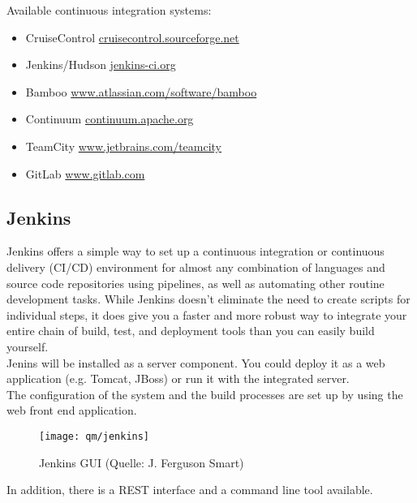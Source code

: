 Available continuous integration systems:
\begin{itemize}
\item CruiseControl \href{http://cruisecontrol.sourceforge.net}
                        {cruisecontrol.sourceforge.net}
\item Jenkins/Hudson \href{http://jenkins-ci.org}{jenkins-ci.org}
\item Bamboo  \href{http://www.atlassian.com/software/bamboo}
     {www.atlassian.com/software/bamboo}
\item Continuum \href{http://continuum.apache.org}{continuum.apache.org}
\item TeamCity  \href{http://www.jetbrains.com/teamcity}
      {www.jetbrains.com/teamcity}
\item GitLab \href{http://www.gitlab.com}
      {www.gitlab.com}
\end{itemize}
%
\newslide
\subsection{Jenkins}
Jenkins offers a simple way to set up a continuous integration or
continuous delivery (CI/CD) environment for almost any combination
of languages and source code repositories using pipelines,
as well as automating other routine development tasks.
While Jenkins doesn’t eliminate the need to create scripts for
individual steps, it does give you a faster and more robust way to
integrate your entire chain of build, test, and deployment tools
than you can easily build yourself.\\
Jenins will be installed as a server component. You could deploy it as
a web application (e.g. Tomcat, JBoss) or run it with the integrated
server.\\
The configuration of the system and the build processes are set up by
using the web front end application.

\begin{figure}[H]
  \centering
  \texttt{[image: qm/jenkins]}
  \caption{Jenkins GUI (Quelle: J. Ferguson Smart)}
  \label{fig:jenkins}
\end{figure}

In addition, there is a REST interface and a command line tool
available.

\vspace{3mm}

